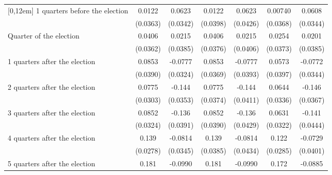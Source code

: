 \begin{table}[!ht]
\begin{tabular}{l*{6}{c}}
[0,12em]
 1 quarters before the election&      0.0122         &      0.0623         &      0.0122         &      0.0623         &     0.00740         &      0.0608         \\
                    &    (0.0363)         &    (0.0342)         &    (0.0398)         &    (0.0426)         &    (0.0368)         &    (0.0344)         \\
[0,12em]
Quarter of the election&      0.0406         &      0.0215         &      0.0406         &      0.0215         &      0.0254         &      0.0201         \\
                    &    (0.0362)         &    (0.0385)         &    (0.0376)         &    (0.0406)         &    (0.0373)         &    (0.0385)         \\
[0,12em]
 1 quarters after the election&      0.0853\sym{*}  &     -0.0777\sym{*}  &      0.0853\sym{*}  &     -0.0777\sym{*}  &      0.0573         &     -0.0772\sym{*}  \\
                    &    (0.0390)         &    (0.0324)         &    (0.0369)         &    (0.0393)         &    (0.0397)         &    (0.0344)         \\
[0,12em]
 2 quarters after the election&      0.0775\sym{*}  &      -0.144\sym{***}&      0.0775\sym{*}  &      -0.144\sym{***}&      0.0644         &      -0.146\sym{***}\\
                    &    (0.0303)         &    (0.0353)         &    (0.0374)         &    (0.0411)         &    (0.0336)         &    (0.0367)         \\
[0,12em]
 3 quarters after the election&      0.0852\sym{**} &      -0.136\sym{***}&      0.0852\sym{*}  &      -0.136\sym{**} &      0.0631         &      -0.141\sym{**} \\
                    &    (0.0324)         &    (0.0391)         &    (0.0390)         &    (0.0429)         &    (0.0322)         &    (0.0444)         \\
[0,12em]
 4 quarters after the election&       0.139\sym{***}&     -0.0814\sym{*}  &       0.139\sym{***}&     -0.0814         &       0.122\sym{***}&     -0.0729         \\
                    &    (0.0278)         &    (0.0345)         &    (0.0385)         &    (0.0434)         &    (0.0285)         &    (0.0401)         \\
[0,12em]
 5 quarters after the election&       0.181\sym{***}&     -0.0990\sym{**} &       0.181\sym{***}&     -0.0990\sym{*}  &       0.172\sym{***}&     -0.0885\sym{*}  \\

\end{tabular}
\end{table}
